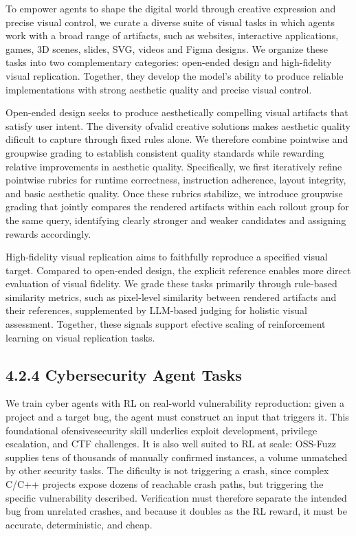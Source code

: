\documentclass[
  10
]{article}
\begin{document}
To empower agents to shape the digital world through creative expression
and precise visual control, we curate a diverse suite of visual tasks in
which agents work with a broad range of artifacts, such as websites,
interactive applications, games, 3D scenes, slides, SVG, videos and
Figma designs. We organize these tasks into two complementary
categories: open-ended design and high-fidelity visual replication.
Together, they develop the model's ability to produce reliable
implementations with strong aesthetic quality and precise visual
control.

Open-ended design seeks to produce aesthetically compelling visual
artifacts that satisfy user intent. The diversity ofvalid creative
solutions makes aesthetic quality dificult to capture through fixed
rules alone. We therefore combine pointwise and groupwise grading to
establish consistent quality standards while rewarding relative
improvements in aesthetic quality. Specifically, we first iteratively
refine pointwise rubrics for runtime correctness, instruction adherence,
layout integrity, and basic aesthetic quality. Once these rubrics
stabilize, we introduce groupwise grading that jointly compares the
rendered artifacts within each rollout group for the same query,
identifying clearly stronger and weaker candidates and assigning rewards
accordingly.

High-fidelity visual replication aims to faithfully reproduce a
specified visual target. Compared to open-ended design, the explicit
reference enables more direct evaluation of visual fidelity. We grade
these tasks primarily through rule-based similarity metrics, such as
pixel-level similarity between rendered artifacts and their references,
supplemented by LLM-based judging for holistic visual assessment.
Together, these signals support efective scaling of reinforcement
learning on visual replication tasks.

\subsection{4.2.4 Cybersecurity Agent
Tasks}\label{cybersecurity-agent-tasks}

We train cyber agents with RL on real-world vulnerability reproduction:
given a project and a target bug, the agent must construct an input that
triggers it. This foundational ofensivesecurity skill underlies exploit
development, privilege escalation, and CTF challenges. It is also well
suited to RL at scale: OSS-Fuzz supplies tens of thousands of manually
confirmed instances, a volume unmatched by other security tasks. The
dificulty is not triggering a crash, since complex C/C++ projects expose
dozens of reachable crash paths, but triggering the specific
vulnerability described. Verification must therefore separate the
intended bug from unrelated crashes, and because it doubles as the RL
reward, it must be accurate, deterministic, and cheap.
\end{document}
